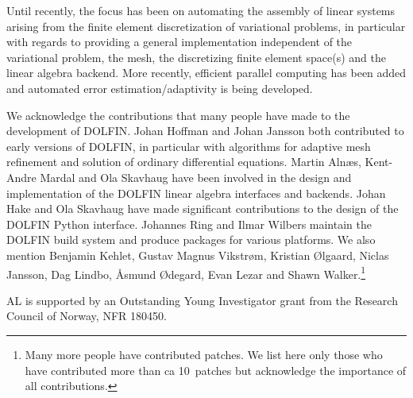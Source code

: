 \documentclass[acmtoms]{acmtrans2m}
\newcommand{\dolfin}{DOLFIN}
\begin{document}
Until recently, the focus has been on automating the assembly of
linear systems arising from the finite element discretization of
variational problems, in particular with regards to providing a
general implementation independent of the variational problem, the
mesh, the discretizing finite element space(s) and the linear algebra
backend.  More recently,  efficient
parallel computing has been  added and
automated error estimation/adaptivity is being developed.
\begin{ack}
We acknowledge the contributions that many people have made to the
development of \dolfin{}. Johan Hoffman and Johan Jansson both
contributed to early versions of \dolfin{}, in particular with
algorithms for adaptive mesh refinement and solution of ordinary
differential equations. Martin Aln{\ae}s, Kent-Andre Mardal and Ola
Skavhaug have been involved in the design and implementation of the
\dolfin{} linear algebra interfaces and backends. Johan Hake and
Ola Skavhaug have made significant contributions to the design of the
\dolfin{} Python interface. Johannes Ring and Ilmar Wilbers maintain
the \dolfin{} build system and produce packages for various
platforms. We also mention Benjamin Kehlet, Gustav Magnus Vikstr\o{}m,
Kristian \O{}lgaard, Niclas Jansson, Dag Lindbo, \AA{}smund
\O{}degard, Evan Lezar and Shawn Walker.\footnote{Many more
  people have contributed patches. We list here only those who have
  contributed more than ca 10~patches but acknowledge the importance of
  all contributions.}

AL is supported by an Outstanding Young Investigator grant from the
Research Council of Norway, NFR 180450.
\end{ack}


\begin{received}
\end{received}
\end{document}
